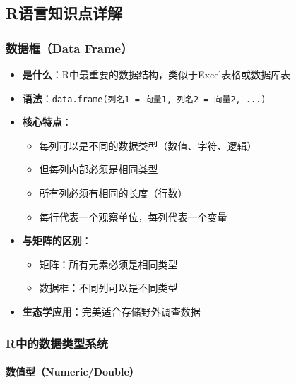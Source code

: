 \documentclass[
]{book}
\providecommand{\tightlist}{%
  \setlength{\itemsep}{0pt}\setlength{\parskip}{0pt}}
\begin{document}
\hypertarget{rux8bedux8a00ux77e5ux8bc6ux70b9ux8be6ux89e3-2}{%
\subsection{R语言知识点详解}\label{rux8bedux8a00ux77e5ux8bc6ux70b9ux8be6ux89e3-2}}

\hypertarget{ux6570ux636eux6846data-frame}{%
\subsubsection{数据框（Data Frame）}\label{ux6570ux636eux6846data-frame}}

\begin{itemize}
\tightlist
\item
  \textbf{是什么}：R中最重要的数据结构，类似于Excel表格或数据库表
\item
  \textbf{语法}：\texttt{data.frame(列名1\ =\ 向量1,\ 列名2\ =\ 向量2,\ ...)}
\item
  \textbf{核心特点}：

  \begin{itemize}
  \tightlist
  \item
    每列可以是不同的数据类型（数值、字符、逻辑）
  \item
    但每列内部必须是相同类型
  \item
    所有列必须有相同的长度（行数）
  \item
    每行代表一个观察单位，每列代表一个变量
  \end{itemize}
\item
  \textbf{与矩阵的区别}：

  \begin{itemize}
  \tightlist
  \item
    矩阵：所有元素必须是相同类型
  \item
    数据框：不同列可以是不同类型
  \end{itemize}
\item
  \textbf{生态学应用}：完美适合存储野外调查数据
\end{itemize}

\hypertarget{rux4e2dux7684ux6570ux636eux7c7bux578bux7cfbux7edf}{%
\subsubsection{R中的数据类型系统}\label{rux4e2dux7684ux6570ux636eux7c7bux578bux7cfbux7edf}}

\hypertarget{ux6570ux503cux578bnumericdouble}{%
\paragraph{数值型（Numeric/Double）}\label{ux6570ux503cux578bnumericdouble}}
\end{document}
